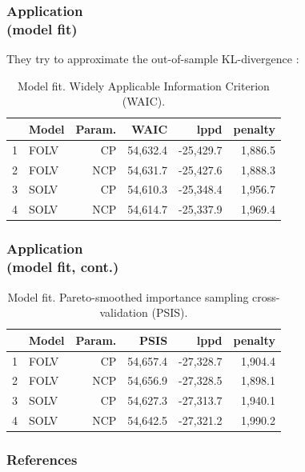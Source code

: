 \documentclass[nonav,sleutel]{beamer}
\begin{document}
	\begin{frame}
		\frametitle{Application \\
			(model fit)}
		They try to approximate the out-of-sample KL-divergence \cite{Kullback_et_al_1951}:
		\begin{table}[H]
			\centering
			\begin{tabular}{rlrrrr}
				\hline
				& Model & Param. & WAIC & lppd & penalty \\  
				\hline\hline
				1 & FOLV & CP &  54,632.4 & -25,429.7 & 1,886.5 \\ 
				2 & FOLV & NCP & 54,631.7 & -25,427.6 & 1,888.3 \\
				\hline
				3 & SOLV & CP &  54,610.3 & -25,348.4 & 1,956.7 \\  
				4 & SOLV & NCP & 54,614.7 & -25,337.9 & 1,969.4 \\ 
				\hline
			\end{tabular}
			\caption[Model fit. Widely Applicable Information Criterion (WAIC).]%
			{Model fit. Widely Applicable Information Criterion (WAIC).}
			\label{tab:model_fit1}
		\end{table}
	\end{frame}
	\begin{frame}
		\frametitle{Application \\
			(model fit, cont.)}
		\begin{table}[H]
			\centering
			\begin{tabular}{rlrrrr}
				\hline
				& Model & Param. & PSIS & lppd & penalty \\  
				\hline\hline
				1 & FOLV & CP &  54,657.4 & -27,328.7 & 1,904.4 \\ 
				2 & FOLV & NCP & 54,656.9 & -27,328.5 & 1,898.1  \\
				\hline
				3 & SOLV & CP &  54,627.3 & -27,313.7 & 1,940.1 \\  
				4 & SOLV & NCP & 54,642.5 & -27,321.2 & 1,990.2 \\ 
				\hline
			\end{tabular}
			\caption[Model fit. Pareto-smoothed importance sampling cross-validation (PSIS).]%
			{Model fit. Pareto-smoothed importance sampling cross-validation (PSIS).}
			\label{tab:model_fit2}
		\end{table} 
	\end{frame}
	\begin{frame}[allowframebreaks]
		\frametitle{References}
		
		
	\end{frame}
\end{document}
